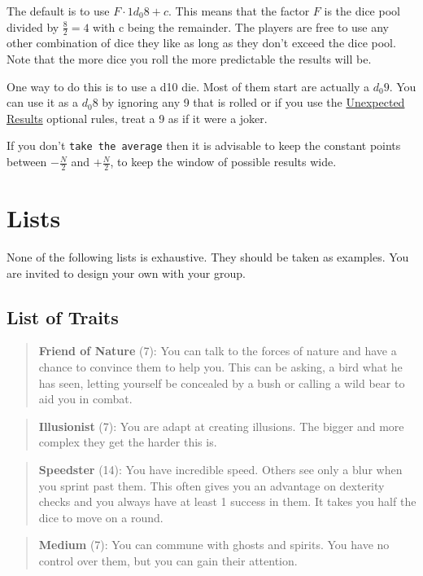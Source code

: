 \documentclass[11pt]{article}
\begin{document}
{The default is to use \(F \cdot 1 d_0 8 + c\). This means that the factor \(F\) is the dice pool divided by \(\frac{8}{2} = 4\) with c being the remainder. The players are free to use any other combination of dice they like as long as they don't exceed the dice pool. Note that the more dice you roll the more predictable the results will be.

One way to do this is to use a d10 die. Most of them start are actually a \(d_0 9\). You can use it as a \(d_0 8\) by ignoring any 9 that is rolled or if you use the \hyperref[sec:org841d25f]{Unexpected Results} optional rules, treat a 9 as if it were a joker.

If you don't \texttt{take the average} then it is advisable to keep the constant points between \(-\frac{N}{2}\) and \(+\frac{N}{2}\), to keep the window of possible results wide. 

\newpage
\section{Lists}
\label{sec:orgd0ff4a5}
None of the following lists is exhaustive. They should be taken as examples. You are invited to design your own with your group.

\subsection{List of Traits}
\label{sec:orgf7e3540}
\begin{quote}
\textbf{Friend of Nature} (7): You can talk to the forces of nature and have a chance to convince them to help you. This can be asking, a bird what he has seen, letting yourself be concealed by a bush or calling a wild bear to aid you in combat.
\end{quote}

\begin{quote}
\textbf{Illusionist} (7): You are adapt at creating illusions. The bigger and more complex they get the harder this is.
\end{quote}

\begin{quote}
\textbf{Speedster} (14): You have incredible speed. Others see only a blur when you sprint past them. This often gives you an advantage on dexterity checks and you always have at least 1 success in them. It takes you half the dice to move on a round.
\end{quote}

\begin{quote}
\textbf{Medium} (7): You can commune with ghosts and spirits. You have no control over them, but you can gain their attention.
\end{quote}

}
\end{document}
